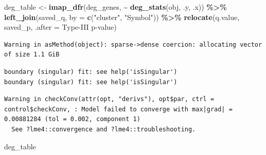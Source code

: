 \documentclass[
  landscape]{article}
\newenvironment{Shaded}{\begin{snugshade}}{\end{snugshade}}
\newcommand{\AttributeTok}[1]{\textcolor[rgb]{0.13,0.29,0.53}{#1}}
\newcommand{\FunctionTok}[1]{\textcolor[rgb]{0.13,0.29,0.53}{\textbf{#1}}}
\newcommand{\NormalTok}[1]{#1}
\newcommand{\OtherTok}[1]{\textcolor[rgb]{0.56,0.35,0.01}{#1}}
\newcommand{\SpecialCharTok}[1]{\textcolor[rgb]{0.81,0.36,0.00}{\textbf{#1}}}
\newcommand{\StringTok}[1]{\textcolor[rgb]{0.31,0.60,0.02}{#1}}
\begin{document}
\begin{Shaded}
\begin{Highlighting}[]
\NormalTok{deg\_table }\OtherTok{\textless{}{-}} \FunctionTok{imap\_dfr}\NormalTok{(deg\_genes, }\SpecialCharTok{\textasciitilde{}} \FunctionTok{deg\_stats}\NormalTok{(obj, .y, .x)) }\SpecialCharTok{\%\textgreater{}\%}
  \FunctionTok{left\_join}\NormalTok{(saved\_q, }\AttributeTok{by =} \FunctionTok{c}\NormalTok{(}\StringTok{"cluster"}\NormalTok{, }\StringTok{"Symbol"}\NormalTok{)) }\SpecialCharTok{\%\textgreater{}\%}
  \FunctionTok{relocate}\NormalTok{(q.value, saved\_p, }\AttributeTok{.after =} \StringTok{\textasciigrave{}}\AttributeTok{Type{-}III p{-}value}\StringTok{\textasciigrave{}}\NormalTok{)}
\end{Highlighting}
\end{Shaded}

\begin{verbatim}
Warning in asMethod(object): sparse->dense coercion: allocating vector of size 1.1 GiB
\end{verbatim}

\begin{verbatim}
boundary (singular) fit: see help('isSingular')
boundary (singular) fit: see help('isSingular')
\end{verbatim}

\begin{verbatim}
Warning in checkConv(attr(opt, "derivs"), opt$par, ctrl = control$checkConv, : Model failed to converge with max|grad| = 0.00881284 (tol = 0.002, component 1)
  See ?lme4::convergence and ?lme4::troubleshooting.
\end{verbatim}

\begin{Shaded}
\begin{Highlighting}[]
\NormalTok{deg\_table}
\end{Highlighting}
\end{Shaded}
\end{document}
